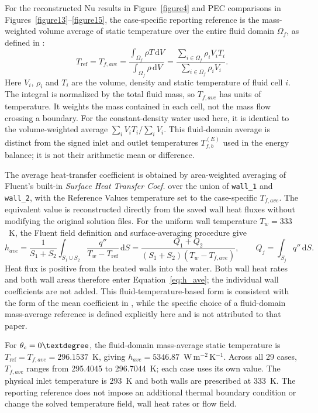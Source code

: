 For the reconstructed Nu results in Figure~\ref{figure4} and PEC comparisons in Figures~\ref{figure13}--\ref{figure15}, the case-specific reporting reference is the mass-weighted volume average of static temperature over the entire fluid domain $\Omega_f$, as defined in \citet[Section~25.4.1, Equation~25--39]{ansys2025surface}:
\[
T_{\mathrm{ref}}=T_{f,ave}
=\frac{\int_{\Omega_f}\rho T\,\mathrm{d}V}{\int_{\Omega_f}\rho\,\mathrm{d}V}
=\frac{\sum_{i\in\Omega_f}\rho_i V_i T_i}{\sum_{i\in\Omega_f}\rho_i V_i}.
\]
Here $V_i$, $\rho_i$ and $T_i$ are the volume, density and static temperature of fluid cell $i$. The integral is normalized by the total fluid mass, so $T_{f,ave}$ has units of temperature. It weights the mass contained in each cell, not the mass flow crossing a boundary. For the constant-density water used here, it is identical to the volume-weighted average $\sum_i V_i T_i/\sum_i V_i$. This fluid-domain average is distinct from the signed inlet and outlet temperatures $T_{f,b}^{(E)}$ used in the energy balance; it is not their arithmetic mean or difference.

The average heat-transfer coefficient is obtained by area-weighted averaging of Fluent's built-in \emph{Surface Heat Transfer Coef.} over the union of \texttt{wall\_1} and \texttt{wall\_2}, with the Reference Values temperature set to the case-specific $T_{f,ave}$. The equivalent value is reconstructed directly from the saved wall heat fluxes without modifying the original solution files. For the uniform wall temperature $T_w=333$~K, the Fluent field definition and surface-averaging procedure \citep{ansys2025htc} give
\begin{equation}
h_{ave}
=\frac{1}{S_1+S_2}\int_{S_1\cup S_2}
\frac{q''}{T_w-T_{\mathrm{ref}}}\,\mathrm{d}S
=\frac{Q_1+Q_2}{(S_1+S_2)(T_w-T_{f,ave})},
\qquad Q_j=\int_{S_j}q''\,\mathrm{d}S .
\label{eq:h_ave}
\end{equation}
Heat flux is positive from the heated walls into the water. Both wall heat rates and both wall areas therefore enter Equation~\eqref{eq:h_ave}; the individual wall coefficients are not added. This fluid-temperature-based form is consistent with the form of the mean coefficient in \citet{jiang2019a}, while the specific choice of a fluid-domain mass-average reference is defined explicitly here and is not attributed to that paper.

For $\theta_c=0\degree$, the fluid-domain mass-average static temperature is $T_{\mathrm{ref}}=T_{f,ave}=296.1537$~K, giving $h_{ave}=5346.87$~W\,m$^{-2}$\,K$^{-1}$. Across all 29 cases, $T_{f,ave}$ ranges from 295.4045 to 296.7044~K; each case uses its own value. The physical inlet temperature is 293~K and both walls are prescribed at 333~K. The reporting reference does not impose an additional thermal boundary condition or change the solved temperature field, wall heat rates or flow field.

